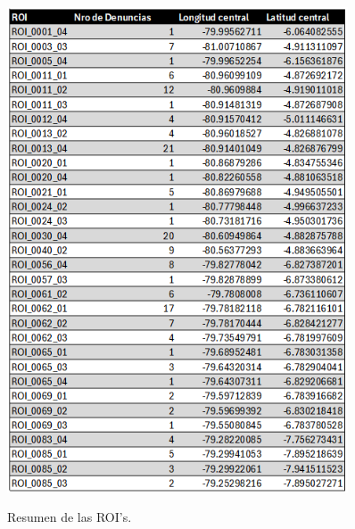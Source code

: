 \begin{figure}[H]
    \centering
    \caption{Resumen de las ROI's.}
    \includegraphics[width=0.9\textwidth]{img/8_capitulo6/ROI_1.png}
    \label{fig:figura_1}
\end{figure}
